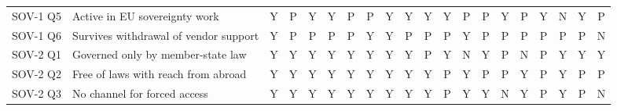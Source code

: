 \begin{table}[p]
\begin{tabular}{@{}l l *{18}{c}@{}}
SOV-1 Q5 & Active in EU sovereignty work & \cellcolor{green!22}Y & \cellcolor{orange!25}P & \cellcolor{green!22}Y & \cellcolor{green!22}Y & \cellcolor{orange!25}P & \cellcolor{orange!25}P & \cellcolor{green!22}Y & \cellcolor{green!22}Y & \cellcolor{green!22}Y & \cellcolor{green!22}Y & \cellcolor{orange!25}P & \cellcolor{orange!25}P & \cellcolor{green!22}Y & \cellcolor{orange!25}P & \cellcolor{green!22}Y & \cellcolor{red!25}N & \cellcolor{green!22}Y & \cellcolor{orange!25}P \\
SOV-1 Q6 & Survives withdrawal of vendor support & \cellcolor{green!22}Y & \cellcolor{orange!25}P & \cellcolor{orange!25}P & \cellcolor{orange!25}P & \cellcolor{orange!25}P & \cellcolor{green!22}Y & \cellcolor{green!22}Y & \cellcolor{orange!25}P & \cellcolor{orange!25}P & \cellcolor{orange!25}P & \cellcolor{green!22}Y & \cellcolor{orange!25}P & \cellcolor{orange!25}P & \cellcolor{orange!25}P & \cellcolor{orange!25}P & \cellcolor{orange!25}P & \cellcolor{orange!25}P & \cellcolor{red!25}N \\
\midrule
SOV-2 Q1 & Governed only by member-state law & \cellcolor{green!22}Y & \cellcolor{green!22}Y & \cellcolor{green!22}Y & \cellcolor{green!22}Y & \cellcolor{green!22}Y & \cellcolor{green!22}Y & \cellcolor{green!22}Y & \cellcolor{green!22}Y & \cellcolor{orange!25}P & \cellcolor{green!22}Y & \cellcolor{red!25}N & \cellcolor{green!22}Y & \cellcolor{orange!25}P & \cellcolor{red!25}N & \cellcolor{orange!25}P & \cellcolor{green!22}Y & \cellcolor{green!22}Y & \cellcolor{green!22}Y \\
SOV-2 Q2 & Free of laws with reach from abroad & \cellcolor{green!22}Y & \cellcolor{green!22}Y & \cellcolor{green!22}Y & \cellcolor{green!22}Y & \cellcolor{green!22}Y & \cellcolor{green!22}Y & \cellcolor{green!22}Y & \cellcolor{green!22}Y & \cellcolor{green!22}Y & \cellcolor{orange!25}P & \cellcolor{green!22}Y & \cellcolor{orange!25}P & \cellcolor{orange!25}P & \cellcolor{green!22}Y & \cellcolor{orange!25}P & \cellcolor{green!22}Y & \cellcolor{orange!25}P & \cellcolor{orange!25}P \\
SOV-2 Q3 & No channel for forced access & \cellcolor{green!22}Y & \cellcolor{green!22}Y & \cellcolor{green!22}Y & \cellcolor{green!22}Y & \cellcolor{green!22}Y & \cellcolor{green!22}Y & \cellcolor{green!22}Y & \cellcolor{green!22}Y & \cellcolor{green!22}Y & \cellcolor{orange!25}P & \cellcolor{green!22}Y & \cellcolor{green!22}Y & \cellcolor{red!25}N & \cellcolor{green!22}Y & \cellcolor{orange!25}P & \cellcolor{green!22}Y & \cellcolor{orange!25}P & \cellcolor{red!25}N \\

\end{tabular}
\end{table}
